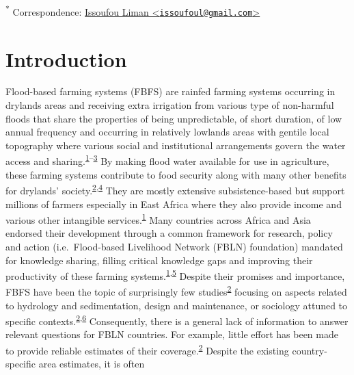 \documentclass[12pt,oneside]{article}
\begin{document}
\textsuperscript{*} Correspondence:
\href{mailto:issoufoul@gmail.com}{Issoufou Liman
\textless{}\href{mailto:issoufoul@gmail.com}{\nolinkurl{issoufoul@gmail.com}}\textgreater{}}

\hypertarget{introduction}{%
\section{Introduction}\label{introduction}}

Flood-based farming systems (FBFS) are rainfed farming systems occurring
in drylands areas and receiving extra irrigation from various type of
non-harmful floods that share the properties of being unpredictable, of
short duration, of low annual frequency and occurring in relatively
lowlands areas with gentile local topography where various social and
institutional arrangements govern the water access and
sharing.\textsuperscript{\protect\hyperlink{ref-Puertas_et_al_2011}{1}--\protect\hyperlink{ref-Varisco_1983}{3}}
By making flood water available for use in agriculture, these farming
systems contribute to food security along with many other benefits for
drylands'
society.\textsuperscript{\protect\hyperlink{ref-VanSteenbergen_et_al_2010}{2},\protect\hyperlink{ref-Xing_et_al_2014}{4}}
They are mostly extensive subsistence-based but support millions of
farmers especially in East Africa where they also provide income and
various other intangible
services.\textsuperscript{\protect\hyperlink{ref-Puertas_et_al_2011}{1}}
Many countries across Africa and Asia endorsed their development through
a common framework for research, policy and action (i.e.~Flood-based
Livelihood Network (FBLN) foundation) mandated for knowledge sharing,
filling critical knowledge gaps and improving their productivity of
these farming
systems.\textsuperscript{\protect\hyperlink{ref-Puertas_et_al_2011}{1},\protect\hyperlink{ref-FBLN_2018}{5}}
Despite their promises and importance, FBFS have been the topic of
surprisingly few
studies\textsuperscript{\protect\hyperlink{ref-VanSteenbergen_et_al_2010}{2}}
focusing on aspects related to hydrology and sedimentation, design and
maintenance, or sociology attuned to specific
contexts.\textsuperscript{\protect\hyperlink{ref-VanSteenbergen_et_al_2010}{2},\protect\hyperlink{ref-Haile_2010}{6}}
Consequently, there is a general lack of information to answer relevant
questions for FBLN countries. For example, little effort has been made
to provide reliable estimates of their
coverage.\textsuperscript{\protect\hyperlink{ref-VanSteenbergen_et_al_2010}{2}}
Despite the existing country-specific area estimates, it is often
\end{document}
